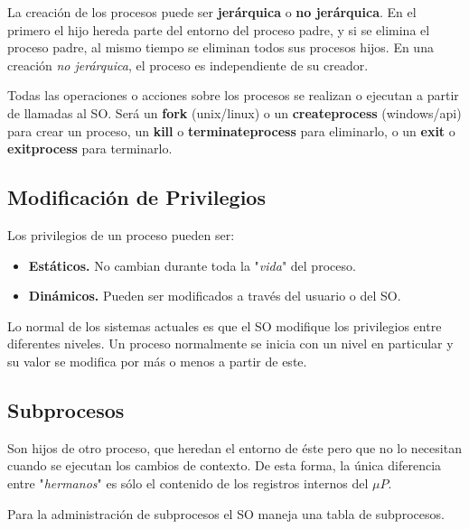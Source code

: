 \documentclass[10pt,a4paper]{article}
\begin{document}
La creación de los procesos puede ser \textbf{jerárquica} o \textbf{no jerárquica}. En el primero el hijo hereda parte del entorno del proceso padre, y si se elimina el proceso padre, al mismo tiempo se eliminan todos sus procesos hijos. En una creación \textit{no jerárquica}, el proceso es independiente de su creador.

Todas las operaciones o acciones sobre los procesos se realizan o ejecutan a partir de llamadas al SO. Será un \textbf{fork} (unix/linux) o un \textbf{createprocess} (windows/api) para crear un proceso, un \textbf{kill} o \textbf{terminateprocess} para eliminarlo, o un \textbf{exit} o \textbf{exitprocess} para terminarlo.

\subsection{Modificación de Privilegios}
Los privilegios de un proceso pueden ser:
\begin{itemize}
\item \textbf{Estáticos.} No cambian durante toda la "\textit{vida}" del proceso.
\item \textbf{Dinámicos.} Pueden ser modificados a través del usuario o del SO.
\end{itemize}
Lo normal de los sistemas actuales es que el SO modifique los privilegios entre diferentes niveles. Un proceso normalmente se inicia con un nivel en particular y su valor se modifica por más o menos a partir de este.

\subsection{Subprocesos}
Son hijos de otro proceso, que heredan el entorno de éste pero que no lo necesitan cuando se ejecutan los cambios de contexto. De esta forma, la única diferencia entre "\textit{hermanos}" es sólo el contenido de los registros internos del $\mu P$. 

Para la administración de subprocesos el SO maneja una tabla de subprocesos.
\end{document}
